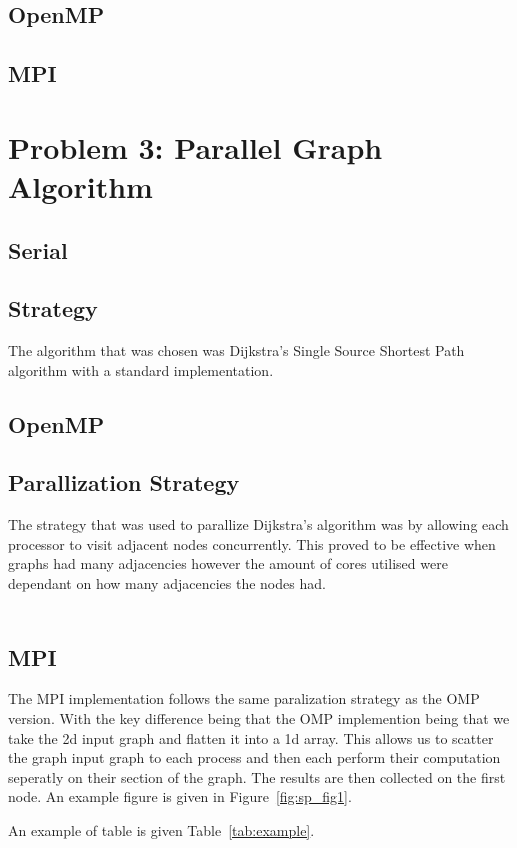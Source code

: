 \subsection{OpenMP} 
\subsection{MPI}
\pagebreak
\section{Problem 3: Parallel Graph Algorithm}
\subsection{Serial}
\subsection*{Strategy}
The algorithm that was chosen was Dijkstra's Single Source Shortest Path algorithm with a standard implementation.
\subsection{OpenMP}
\subsection*{Parallization Strategy}
The strategy that was used to parallize Dijkstra's algorithm was by allowing each processor to visit adjacent nodes concurrently. This proved to be effective when graphs had many adjacencies however the amount of cores utilised were dependant on how many adjacencies the nodes had.\\\\

\subsection{MPI}
The MPI implementation follows the same paralization strategy as the OMP version. With the key difference being that the OMP implemention being that we take the 2d input graph and flatten it into a 1d array. This allows us to scatter the graph input graph to each process and then each perform their computation seperatly on their section of the graph. The results are then collected on the first node. 
An example figure is given in Figure~\ref{fig:sp_fig1}.

An example of table is given Table~\ref{tab:example}.


